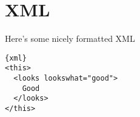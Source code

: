 
\section{XML}
Here's some nicely formatted XML
\begin{verbatim}{xml}
<this>
  <looks lookswhat="good">
    Good
  </looks>
</this>
\end{verbatim}

